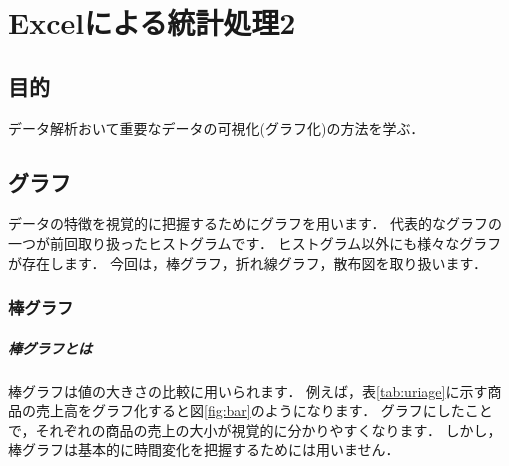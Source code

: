 
\chapter{Excelによる統計処理2}
\setcounter{num_prac}{0}

\section{目的}

データ解析おいて重要なデータの可視化(グラフ化)の方法を学ぶ．

\section{グラフ}

データの特徴を視覚的に把握するためにグラフを用います．
代表的なグラフの一つが前回取り扱ったヒストグラムです．
ヒストグラム以外にも様々なグラフが存在します．
今回は，棒グラフ，折れ線グラフ，散布図を取り扱います．

\subsection{棒グラフ}

\paragraph{棒グラフとは}

棒グラフは値の大きさの比較に用いられます．
例えば，表\ref{tab:uriage}に示す商品の売上高をグラフ化すると図\ref{fig:bar}のようになります．
グラフにしたことで，それぞれの商品の売上の大小が視覚的に分かりやすくなります．
しかし，棒グラフは基本的に時間変化を把握するためには用いません．

